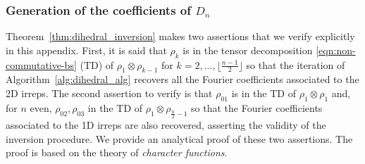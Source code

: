 \documentclass{article}
\theoremstyle{plain}
\theoremstyle{definition}
\theoremstyle{remark}
\begin{document}
\subsubsection{Generation of the coefficients of $D_n$}\label{app:generating_dihedral}
Theorem~\ref{thm:dihedral_inversion} makes two assertions that we verify explicitly in this appendix. First, it is said that $\rho_{k}$ is in the tensor decomposition \eqref{eqn:non-commutative-bs} (TD) of $\rho_1\otimes\rho_{k-1}$ for $k = 2,...,\lfloor\frac{n-1}{2}\rfloor$ so that the iteration of Algorithm~\ref{alg:dihedral_alg} recovers all the Fourier coefficients associated to the 2D irreps. The second assertion to verify is that $\rho_{01}$ is in the TD of $ \rho_1\otimes\rho_1$ and, for $n$ even,  $\rho_{02},\rho_{03}$ in the TD of $\rho_1\otimes\rho_{\frac{n}{2}-1}$ so that the Fourier coefficients associated to the 1D irreps are also recovered, asserting the validity of the inversion procedure. We provide an analytical proof of these two assertions. The proof is based on the theory of \emph{character functions}.
\end{document}
